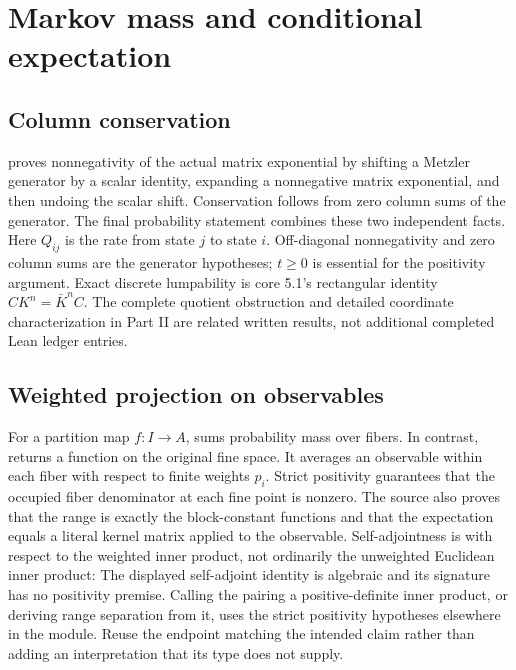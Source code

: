 \clearpage\section{Markov mass and conditional expectation}
\label{sec:probability}
\subsection{Column conservation}
 proves nonnegativity of the actual matrix exponential by shifting a Metzler generator by a scalar identity, expanding a nonnegative matrix exponential, and then undoing the scalar shift. Conservation follows from zero column sums of the generator. The final probability statement combines these two independent facts.
Here $Q_{ij}$ is the rate from state $j$ to state $i$. Off-diagonal nonnegativity and zero column sums are the generator hypotheses; $t\ge0$ is essential for the positivity argument. Exact discrete lumpability is core 5.1's rectangular identity $CK^n=\bar K^nC$. The complete quotient obstruction and detailed coordinate characterization in Part II are related written results, not additional completed Lean ledger entries.

\subsection{Weighted projection on observables}
For a partition map $f:I\to A$,  sums probability mass over fibers. In contrast,  returns a function on the original fine space. It averages an observable within each fiber with respect to finite weights $p_i$. Strict positivity guarantees that the occupied fiber denominator at each fine point is nonzero.
The source also proves that the range is exactly the block-constant functions and that the expectation equals a literal kernel matrix applied to the observable. Self-adjointness is with respect to the weighted inner product, not ordinarily the unweighted Euclidean inner product:
The displayed self-adjoint identity is algebraic and its signature has no positivity premise. Calling the pairing a positive-definite inner product, or deriving range separation from it, uses the strict positivity hypotheses elsewhere in the module. Reuse the endpoint matching the intended claim rather than adding an interpretation that its type does not supply.

